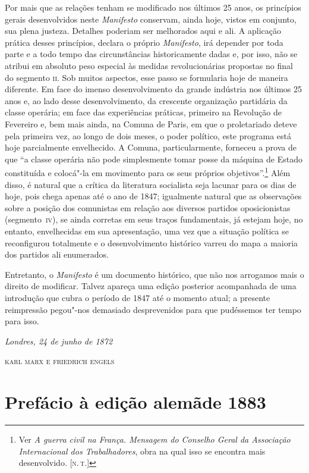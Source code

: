 Por mais que as relações tenham se modificado nos últimos 25
anos, os princípios gerais desenvolvidos neste \textit{Manifesto}
conservam, ainda hoje, vistos em conjunto, sua plena justeza. Detalhes
poderiam ser melhorados aqui e ali. A aplicação prática desses
princípios, declara o próprio \textit{Manifesto}, irá depender por toda
parte e a todo tempo das circunstâncias historicamente dadas e, por
isso, não se atribui em absoluto peso especial às medidas
revolucionárias propostas no final do segmento \textsc{ii}. Sob muitos aspectos,
esse passo se formularia hoje de maneira diferente. Em face do imenso
desenvolvimento da grande indústria nos últimos 25 anos e,
ao lado desse desenvolvimento, da crescente organização partidária da
classe operária; em face das experiências práticas, primeiro na
Revolução de Fevereiro e, bem mais ainda, na Comuna de Paris, em que o
proletariado deteve pela primeira vez, ao longo de dois meses, o poder
político, este programa está hoje parcialmente envelhecido. A Comuna,
particularmente, forneceu a prova de que ``a classe operária não pode
simplesmente tomar posse da máquina de Estado constituída e colocá"-la
em movimento para os seus próprios objetivos''.\footnote{Ver \textit{A guerra
civil na França. Mensagem do Conselho Geral da Associação Internacional
dos Trabalhadores}, obra na qual isso se encontra mais
desenvolvido. [\textsc{n.\,t.}]} Além disso, é natural que a crítica da literatura
socialista seja lacunar para os dias de hoje, pois chega apenas até o
ano de 1847; igualmente natural que as observações sobre a posição dos
comunistas em relação aos diversos partidos oposicionistas (\mbox{segmento \textsc{iv}}),
se ainda corretas em seus traços fundamentais, já estejam hoje, no entanto, envelhecidas em sua apresentação, uma vez que a situação
política se reconfigurou totalmente e o desenvolvimento histórico
varreu do mapa a maioria dos partidos ali enumerados.

Entretanto, o \textit{Manifesto} é um documento histórico, que não nos
arrogamos mais o direito de modificar. Talvez apareça uma edição
posterior acompanhada de uma introdução que cubra o período de 1847 até
o momento atual; a presente reimpressão pegou"-nos demasiado
desprevenidos para que pudéssemos ter tempo para isso.

\bigskip

\hfill\textit{Londres, 24 de junho de 1872}

\hfill\textsc{karl marx e friedrich engels}


\chapter[Prefácio à edição alemã de 1883]{Prefácio à edição alemã\break de 1883}

